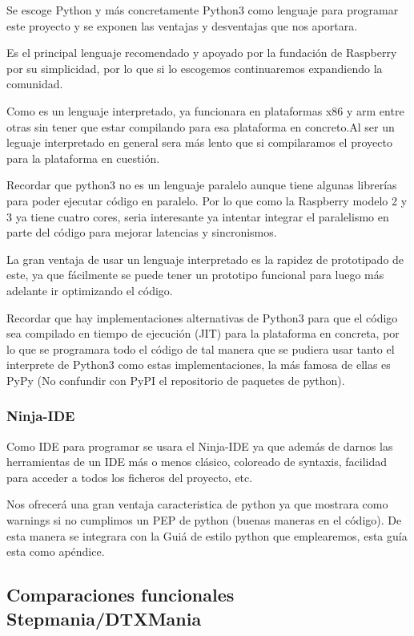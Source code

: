 \documentclass[a4paper,11pt,oneside]{book}
\begin{document}
Se escoge Python y más concretamente Python3 como lenguaje para programar este proyecto y se exponen las ventajas y desventajas que nos aportara.

Es el principal lenguaje recomendado y apoyado por la fundación de Raspberry por su simplicidad, por lo que si lo escogemos continuaremos expandiendo la comunidad.

Como es un lenguaje interpretado, ya funcionara en plataformas x86 y arm entre otras sin tener que estar compilando para esa plataforma en concreto.Al ser un leguaje interpretado en general sera más lento que si compilaramos el proyecto para la plataforma en cuestión.

Recordar que python3 no es un lenguaje paralelo aunque tiene algunas librerías para poder ejecutar código en paralelo. Por lo que como la Raspberry modelo 2 y 3 ya tiene cuatro cores, seria interesante ya intentar integrar el paralelismo en parte del código para mejorar latencias y sincronismos.

La gran ventaja de usar un lenguaje interpretado es la rapidez de prototipado de este, ya que fácilmente se puede tener un prototipo funcional para luego más adelante ir optimizando el código.

Recordar que hay implementaciones alternativas de Python3 para que el código sea compilado en tiempo de ejecución (JIT) para la plataforma en concreta, por lo que se programara todo el código de tal manera que se pudiera usar tanto el interprete de Python3 como estas implementaciones, la más famosa de ellas es PyPy (No confundir con PyPI el repositorio de paquetes de python).

\subsubsection{Ninja-IDE}
Como IDE para programar se usara el Ninja-IDE ya que además de darnos las herramientas de un IDE más o menos clásico, coloreado de syntaxis, facilidad para acceder a todos los ficheros del proyecto, etc.

Nos ofrecerá una gran ventaja caracteristica de python ya que mostrara como warnings si no cumplimos un PEP de python (buenas maneras en el código).
De esta manera se integrara con la Guiá de estilo python que emplearemos, esta guía esta como apéndice.


\subsection{Comparaciones funcionales Stepmania/DTXMania}
\end{document}
